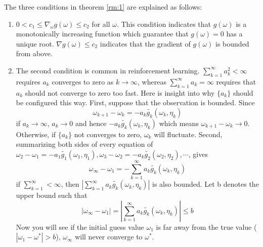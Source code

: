   The three conditions  in theorem \ref{rm:1} are explained as follows:
  \begin{enumerate}
    \item
          $0<c_{1} \le \nabla_{\omega}g(\omega) \le c_{2}$ for all $\omega$. This condition indicates that $g(\omega)$ is a
          monotonically increasing function which guarantee that $g(\omega)=0$ has a unique root. $\nabla g(\omega) \le c_{2}$
          indicates that the gradient of $g(\omega)$ is bounded from above.
    \item
          The second condition is common in reinforcement learning. $\sum_{k=1}^{\infty}a_{k}^{2} < \infty$ requires $a_{k}$
          converges to zero as $k \to \infty$, whereas $\sum_{k=1}^{\infty}a_{k}=\infty$ requires that $a_{k}$ should not
          converge to zero too fast. Here is insight into why $\{a_{k}\}$ should be configured this way. First, suppose that the
          observation is bounded. Since
          \begin{equation*}
            \omega_{k+1} - \omega_{k} = -a_{k}\tilde{g_{k}}(\omega_{k},\eta_{k})
          \end{equation*}
          if $a_{k}\to \infty$, $a_{k}\to 0$ and hence $-a_{k}\tilde{g_{k}}(\omega_{k},\eta_{k})$ which means
          $\omega_{k+1}-\omega_{k} \to 0$. Otherwise, if $\{a_{k}\}$ not converges to zero, $\omega_{k}$ will fluctuate. Second,
          summarizing both sides of every equation of $\omega_{2} - \omega_{1} = -a_{1}\tilde{g_{1}}(\omega_{1},\eta_{1}),
            \omega_{3} - \omega_{2} = -a_{k}\tilde{g_{2}}(\omega_{2},\eta_{2}), \cdots$, gives
          \begin{equation*}
            \omega_{\infty} - \omega_{1} = -\sum_{k=1}^{\infty}a_{k}\tilde{g_{k}}(\omega_{k},\eta_{k})
          \end{equation*}
          if $\sum_{k=1}^{\infty}<\infty$, then $\left|\sum_{k=1}^{\infty}a_{k}\tilde{g_{k}}(\omega_{k},\eta_{k})\right|$ is
          also bounded. Let b denotes the upper bound such that
          \begin{equation*}
            \left|\omega_{\infty} - \omega_{1}\right| = \left|\sum_{k=1}^{\infty}a_{k}\tilde{g_{k}}(\omega_{k},\eta_{k})\right|
            \le b
          \end{equation*}
          Now you will see if the initial guess value $\omega_{1}$ is far away from the true value
          ($\left|\omega_{1}-\omega^{*}\right|>b$), $\omega_{\infty}$ will never converge to $\omega^{*}$.
  \end{enumerate}

